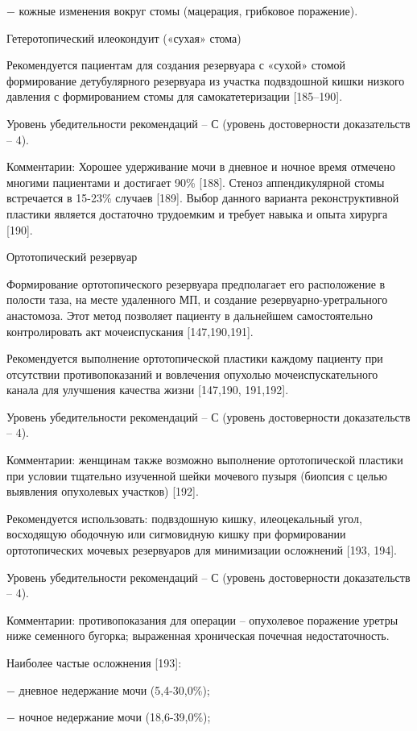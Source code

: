 − кожные изменения вокруг стомы (мацерация, грибковое поражение).

Гетеротопический илеокондуит («сухая» стома)

Рекомендуется пациентам для создания резервуара с «сухой» стомой формирование детубулярного резервуара из участка подвздошной кишки низкого давления с формированием стомы для самокатетеризации [185–190].

Уровень убедительности рекомендаций – С (уровень достоверности доказательств – 4).

Комментарии: Хорошее удерживание мочи в дневное и ночное время отмечено многими пациентами и достигает 90\% [188]. Стеноз аппендикулярной стомы встречается в 15-23\% случаев [189]. Выбор данного варианта реконструктивной пластики является достаточно трудоемким и требует навыка и опыта хирурга [190].

Ортотопический резервуар

Формирование ортотопического резервуара предполагает его расположение в полости таза, на месте удаленного МП, и создание резервуарно-уретрального анастомоза. Этот метод позволяет пациенту в дальнейшем самостоятельно контролировать акт мочеиспускания [147,190,191].

Рекомендуется выполнение ортотопической пластики каждому пациенту при отсутствии противопоказаний и вовлечения опухолью мочеиспускательного канала для улучшения качества жизни [147,190, 191,192].

Уровень убедительности рекомендаций – С (уровень достоверности доказательств – 4).

Комментарии: женщинам также возможно выполнение ортотопической пластики при условии тщательно изученной шейки мочевого пузыря (биопсия с целью выявления опухолевых участков) [192].

Рекомендуется использовать: подвздошную кишку, илеоцекальный угол, восходящую ободочную или сигмовидную кишку при формировании ортотопических мочевых резервуаров для минимизации осложнений [193, 194].

Уровень убедительности рекомендаций – С (уровень достоверности доказательств – 4).

Комментарии: противопоказания для операции – опухолевое поражение уретры ниже семенного бугорка; выраженная хроническая почечная недостаточность.

Наиболее частые осложнения [193]:

− дневное недержание мочи (5,4-30,0\%);

− ночное недержание мочи (18,6-39,0\%);

